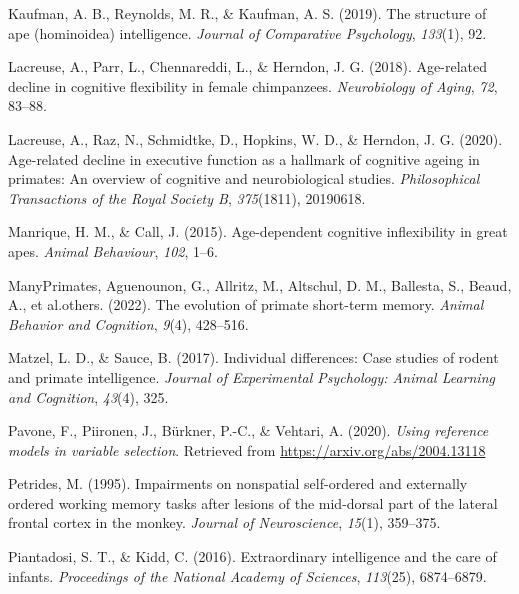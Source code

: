 \documentclass[
  man,floatsintext]{apa6}
\newlength{\cslhangindent}
\newlength{\cslentryspacingunit} %
\newenvironment{CSLReferences}[2] %
 {%
  \setlength{\parindent}{0pt}
  \ifodd #1
  \let\oldpar\par
  \def\par{\hangindent=\cslhangindent\oldpar}
  \fi
  \setlength{\parskip}{#2\cslentryspacingunit}
 }%
 {}
\begin{document}
\begin{CSLReferences}{1}{0}
\leavevmode{}%
Kaufman, A. B., Reynolds, M. R., \& Kaufman, A. S. (2019). The structure of ape (hominoidea) intelligence. \emph{Journal of Comparative Psychology}, \emph{133}(1), 92.

\leavevmode{}%
Lacreuse, A., Parr, L., Chennareddi, L., \& Herndon, J. G. (2018). Age-related decline in cognitive flexibility in female chimpanzees. \emph{Neurobiology of Aging}, \emph{72}, 83--88.

\leavevmode{}%
Lacreuse, A., Raz, N., Schmidtke, D., Hopkins, W. D., \& Herndon, J. G. (2020). Age-related decline in executive function as a hallmark of cognitive ageing in primates: An overview of cognitive and neurobiological studies. \emph{Philosophical Transactions of the Royal Society B}, \emph{375}(1811), 20190618.

\leavevmode{}%
Manrique, H. M., \& Call, J. (2015). Age-dependent cognitive inflexibility in great apes. \emph{Animal Behaviour}, \emph{102}, 1--6.

\leavevmode{}%
ManyPrimates, Aguenounon, G., Allritz, M., Altschul, D. M., Ballesta, S., Beaud, A., et al.others. (2022). The evolution of primate short-term memory. \emph{Animal Behavior and Cognition}, \emph{9}(4), 428--516.

\leavevmode{}%
Matzel, L. D., \& Sauce, B. (2017). Individual differences: Case studies of rodent and primate intelligence. \emph{Journal of Experimental Psychology: Animal Learning and Cognition}, \emph{43}(4), 325.

\leavevmode{}%
Pavone, F., Piironen, J., Bürkner, P.-C., \& Vehtari, A. (2020). \emph{Using reference models in variable selection}. Retrieved from \url{https://arxiv.org/abs/2004.13118}

\leavevmode{}%
Petrides, M. (1995). Impairments on nonspatial self-ordered and externally ordered working memory tasks after lesions of the mid-dorsal part of the lateral frontal cortex in the monkey. \emph{Journal of Neuroscience}, \emph{15}(1), 359--375.

\leavevmode{}%
Piantadosi, S. T., \& Kidd, C. (2016). Extraordinary intelligence and the care of infants. \emph{Proceedings of the National Academy of Sciences}, \emph{113}(25), 6874--6879.


\end{CSLReferences}
\end{document}
